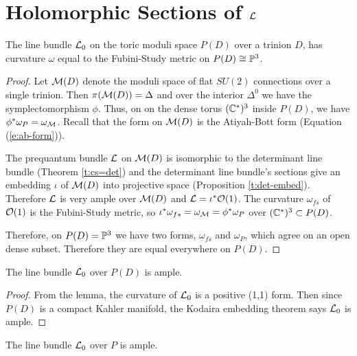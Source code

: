\section{Holomorphic Sections of $\mathcal{L}$}
\begin{lemma}
	The line bundle $\mathcal{L}_0$ on the toric moduli space $P(D)$ over a trinion $D$, has curvature $\omega$ equal to the Fubini-Study metric on $P(D) \cong \mathbb{P}^3$.
\end{lemma}
{\tiny }\begin{proof}
	Let $\mathcal{M}(D)$ denote the moduli space of flat $SU(2)$ connections over a single trinion. Then $\pi(\mathcal{M}(D)) = \Delta$ and over the interior $\Delta^{0}$ we have the symplectomorphism $\phi$. Thus, on on the dense torus $(\mathbb{C}^\ast)^3$ inside $P(D)$, we have $\phi^\ast \omega_P = \omega_{\mathcal{M}}$. Recall that the form on $\mathcal{M}(D)$ is the Atiyah-Bott form (Equation (\ref{e:ab-form})).
	
	The prequantum bundle $\mathcal{L}$ on $\mathcal{M}(D)$ is isomorphic to the determinant line bundle (Theorem \ref{t:cs=det}) and the determinant line bundle's sections give an embedding $\iota$ of $\mathcal{M}(D)$ into projective space (Proposition \ref{t:det-embed}). Therefore $\mathcal{L}$ is very ample over $\mathcal{M}(D)$ and $\mathcal{L} = \iota^\ast \mathcal{O}(1)$. The curvature $\omega_{fs}$ of $\mathcal{O}(1)$ is the Fubini-Study metric, so $\iota^\ast \omega_{fs} = \omega_{\mathcal{M}} = \phi^\ast \omega_P$ over $(\mathbb{C}^\ast)^3 \subset P(D)$.
	
	Therefore, on $P(D) = \mathbb{P}^3$ we have two forms, $\omega_{fs}$ and $\omega_P$, which agree on an open dense subset. Therefore they are equal everywhere on $P(D)$.
\end{proof}
\begin{corollary}
	\label{t:P3-veryample}
	The line bundle $\mathcal{L}_0$ over $P(D)$ is ample.
\end{corollary}
\begin{proof}
	From the lemma, the curvature of $\mathcal{L}_0$ is a positive (1,1) form. Then since $P(D)$ is a compact Kahler manifold, the Kodaira embedding theorem says $\mathcal{L}_0$ is ample.
\end{proof}
\begin{theorem}
	\label{t:lp-ample}
	The line bundle $\mathcal{L}_0$ over $P$ is ample. 
\end{theorem}
